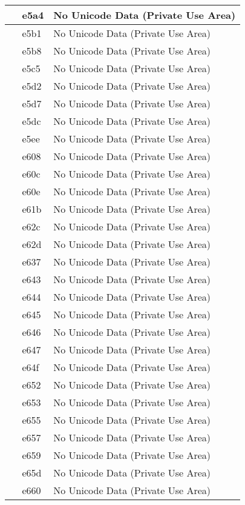 \documentclass[12pt,letterpaper,openany]{book}
\begin{document}
\begin{center}
\begin{supertabular}{|m{0.25in}|m{0.5in}|m{4in}|}
 & e5a4 & No Unicode Data (Private Use Area)\\\hline
 & e5b1 & No Unicode Data (Private Use Area)\\\hline
 & e5b8 & No Unicode Data (Private Use Area)\\\hline
 & e5c5 & No Unicode Data (Private Use Area)\\\hline
 & e5d2 & No Unicode Data (Private Use Area)\\\hline
 & e5d7 & No Unicode Data (Private Use Area)\\\hline
 & e5dc & No Unicode Data (Private Use Area)\\\hline
 & e5ee & No Unicode Data (Private Use Area)\\\hline
 & e608 & No Unicode Data (Private Use Area)\\\hline
 & e60c & No Unicode Data (Private Use Area)\\\hline
 & e60e & No Unicode Data (Private Use Area)\\\hline
 & e61b & No Unicode Data (Private Use Area)\\\hline
 & e62c & No Unicode Data (Private Use Area)\\\hline
 & e62d & No Unicode Data (Private Use Area)\\\hline
 & e637 & No Unicode Data (Private Use Area)\\\hline
 & e643 & No Unicode Data (Private Use Area)\\\hline
 & e644 & No Unicode Data (Private Use Area)\\\hline
 & e645 & No Unicode Data (Private Use Area)\\\hline
 & e646 & No Unicode Data (Private Use Area)\\\hline
 & e647 & No Unicode Data (Private Use Area)\\\hline
 & e64f & No Unicode Data (Private Use Area)\\\hline
 & e652 & No Unicode Data (Private Use Area)\\\hline
 & e653 & No Unicode Data (Private Use Area)\\\hline
 & e655 & No Unicode Data (Private Use Area)\\\hline
 & e657 & No Unicode Data (Private Use Area)\\\hline
 & e659 & No Unicode Data (Private Use Area)\\\hline
 & e65d & No Unicode Data (Private Use Area)\\\hline
 & e660 & No Unicode Data (Private Use Area)\\\hline

\end{supertabular}
\end{center}
\end{document}
